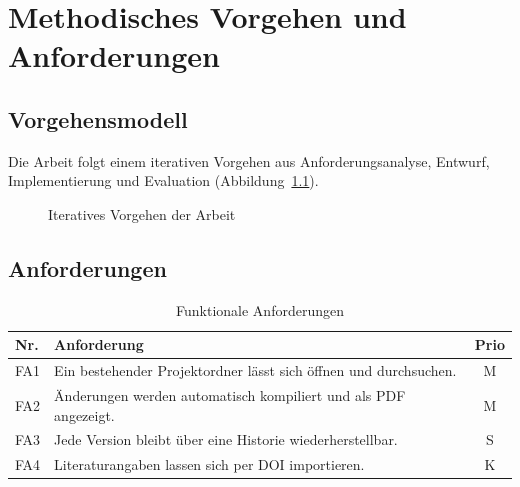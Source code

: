 \chapter{Methodisches Vorgehen und Anforderungen}
\label{cha:methodik}


\section{Vorgehensmodell}
\label{sec:vorgehen}

Die Arbeit folgt einem iterativen Vorgehen aus Anforderungsanalyse, Entwurf,
Implementierung und Evaluation (\vgl Abbildung~\ref{fig:vorgehen}).

\begin{figure}[htbp]
  \centering
  \caption{Iteratives Vorgehen der Arbeit}
  \label{fig:vorgehen}
\end{figure}

\section{Anforderungen}
\label{sec:anforderungen}


\begin{table}[htbp]
  \centering
  \caption{Funktionale Anforderungen}
  \label{tab:anforderungen-funktional}
  \begin{tabularx}{\textwidth}{lXc}
    \toprule
    Nr. & Anforderung & Prio \\
    \midrule
    FA1 & Ein bestehender Projektordner lässt sich öffnen und durchsuchen. & M \\
    FA2 & Änderungen werden automatisch kompiliert und als PDF angezeigt. & M \\
    FA3 & Jede Version bleibt über eine Historie wiederherstellbar. & S \\
    FA4 & Literaturangaben lassen sich per DOI importieren. & K \\
    \bottomrule
  \end{tabularx}
\end{table}

